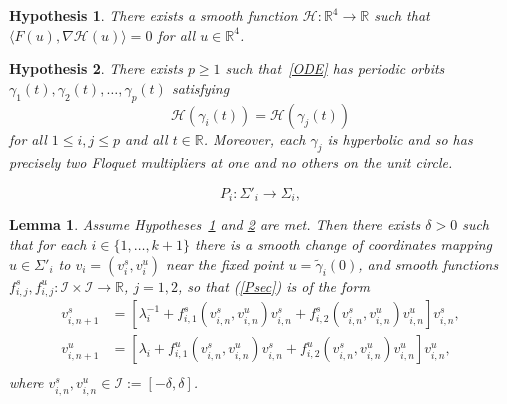 \documentclass[10pt,a4paper]{amsart}
\newtheorem{hyp}{Hypothesis}
\newtheorem{lem}{Lemma}
\newcommand{\R}{\mathbb{R}}
\begin{document}
\begin{hyp}\label{hyp:Ham} %
There exists a smooth function $\mathcal{H}:\R^4\to\R$ such that $\langle F(u),\nabla \mathcal{H}(u) \rangle = 0$ for all $u \in \R^4$.
\end{hyp}

\begin{hyp}\label{hyp:Periodic} %
There exists $p \geq 1$ such that~\eqref{ODE} has periodic orbits $\gamma_1(t), \gamma_2(t), \dots, \gamma_p(t)$ satisfying 
\begin{equation}
	\mathcal{H}(\gamma_i(t)) = \mathcal{H}(\gamma_j(t))
\end{equation}
for all $1 \leq i,j \leq p$ and all $t \in \R$. Moreover, each $\gamma_j$ is hyperbolic and so has precisely two Floquet multipliers at one and no others on the unit circle.
\end{hyp}

\begin{equation}\label{Psec}
	P_i: \Sigma'_i \to \Sigma_i,
\end{equation} 

\begin{lem}\label{lem:Shil} %
Assume Hypotheses~\ref{hyp:Ham} and \ref{hyp:Periodic} are met. Then there exists $\delta > 0$ such that for each ${i \in \{1,\dots,k+1\}}$ there is a smooth change of coordinates mapping $u\in\Sigma'_i$ to $v_i = (v^s_i,v^u_i)$ near the fixed point $u = \tilde\gamma_i(0)$, and smooth functions $f^s_{i,j},f^u_{i,j}:\mathcal{I}\times\mathcal{I}\to \mathbb{R}$, $j = 1,2$, so that (\ref{Psec}) is of the form 
	\begin{equation}\label{Shil}
		\begin{split}
			v^s_{i,n+1} &= [\lambda_i^{-1} + f_{i,1}^s(v^s_{i,n},v^u_{i,n})v^s_{i,n} + f_{i,2}^s(v^s_{i,n},v^u_{i,n})v^u_{i,n}]v^s_{i,n}, \\
			v^u_{i,n+1} &= [\lambda_i + f_{i,1}^u(v^s_{i,n},v^u_{i,n})v^s_{i,n} + f_{i,2}^u(v^s_{i,n},v^u_{i,n})v^u_{i,n}]v^u_{i,n}, \\
		\end{split}
	\end{equation}	
	where $v^s_{i,n},v^u_{i,n} \in \mathcal{I} := [-\delta,\delta]$.
\end{lem}
\end{document}
